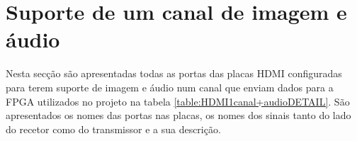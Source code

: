 %

\section{Suporte de um canal de imagem e áudio} \label {ap1:HDMIconfig+audio}

Nesta secção são apresentadas todas as portas das placas HDMI configuradas para terem suporte de imagem e áudio num canal que enviam dados para a FPGA utilizados no projeto na tabela \ref{table:HDMI1canal+audioDETAIL}. São apresentados os nomes das portas nas placas, os nomes dos sinais tanto do lado do recetor como do transmissor e a sua descrição.

